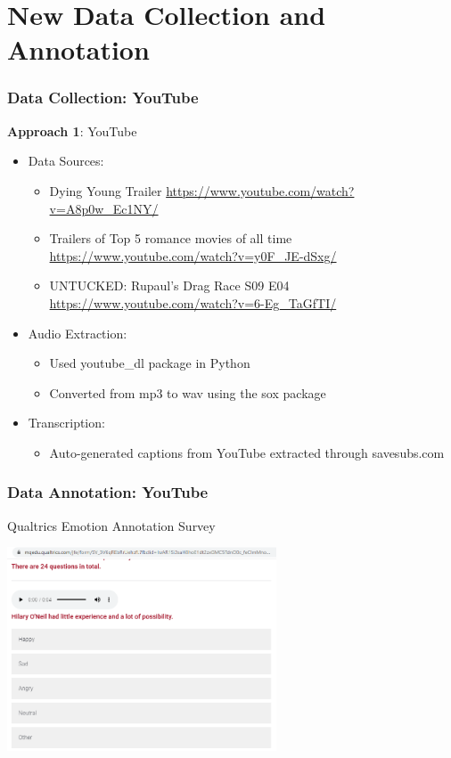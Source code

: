\documentclass{beamer}
\begin{document}
\section{New Data Collection and Annotation}


\begin{frame}
\frametitle{Data Collection: YouTube}

\textbf{Approach 1}: YouTube
\begin{itemize}
\item Data Sources:
    \begin{itemize}
    	 \item Dying Young Trailer \url{https://www.youtube.com/watch?v=A8p0w_Ec1NY/}	
    	 \item Trailers of Top 5 romance movies of all time \url{https://www.youtube.com/watch?v=y0F_JE-dSxg/}
     	 \item UNTUCKED: Rupaul's Drag Race S09 E04 \url{https://www.youtube.com/watch?v=6-Eg_TaGfTI/}
    \end{itemize}
\item Audio Extraction:
    \begin{itemize}
    	 \item Used youtube\_dl package in Python	
    	 \item Converted from mp3 to wav using the sox package
    \end{itemize}
\item Transcription:
    \begin{itemize}
    	 \item	Auto-generated captions from YouTube extracted through savesubs.com
    \end{itemize}
\end{itemize}
\end{frame}


\begin{frame}
\frametitle{Data Annotation: YouTube}

Qualtrics Emotion Annotation Survey
\begin{center}
    \includegraphics[width=8cm]{images/Qualtrics_Survey.png}
\end{center}
\end{frame}
\end{document}
